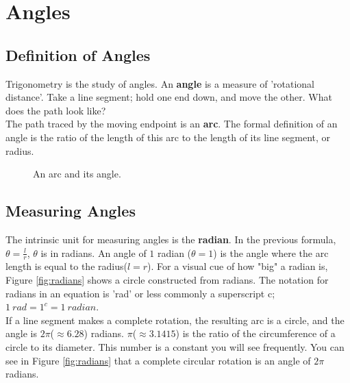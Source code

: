 \section{Angles}
\subsection{Definition of Angles}

Trigonometry is the study of angles.  An {\bf angle} is a measure of 'rotational distance'.  Take a line segment; hold one end down, and move the other.  What does the path look like?\\

The path traced by the moving endpoint is an {\bf arc}.  The formal definition of an angle is the ratio of the length of this arc to the length of its line segment, or radius.

\begin{figure}[htb]
\center
\caption{An arc and its angle.}
\label{fig:arc_and_angle}
\end{figure}


\subsection{Measuring Angles}

The intrinsic unit for measuring angles is the {\bf radian}.  In the previous formula, $\theta = \frac{l}{r}$, $\theta$ is in radians.  An angle of $1$ radian ($\theta = 1$) is the angle where the arc length is equal to the radius($l = r$). For a visual cue of how "big" a radian is, Figure \ref{fig:radians} shows a circle constructed from radians.  The notation for radians in an equation is 'rad' or less commonly a superscript c;  $1\  rad = 1^c = 1 \ radian$.\\

If a line segment makes a complete rotation, the resulting arc is a circle, and the angle is $2\pi$($\approx 6.28$) radians.  $\pi$($\approx 3.1415$) is the ratio of the circumference of a circle to its diameter.  This number is a constant you will see frequently.  You can see in  Figure \ref{fig:radians} that a complete circular rotation is an angle of $2\pi$ radians.\\

